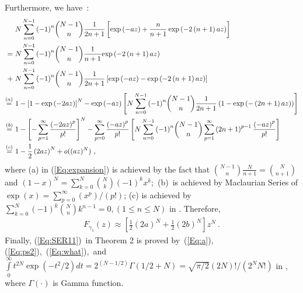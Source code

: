 \documentclass[onecolumn,letterpaper,11pt,draftclsnofoot]{IEEEtran}
\begin{document}
Furthermore,  we have~:
\begin{align} \label{Eq:expansion}
&N\sum\limits_{n = 0}^{N - 1} {\left( { - 1} \right)^n }
\binom{N-1}{n}\frac{1}{{2n + 1}}\left[ {\exp \left( { - az} \right)
+ \frac{n}{{n + 1}}\exp \left( { - 2\left( {n + 1} \right)az}
\right)} \right]\\\notag =~&N\sum\limits_{n = 0}^{N - 1} {\left( { -
1} \right)^n } \binom{N-1}{n}\frac{1}{{n + 1}} {\exp \left( { -
2\left( {n + 1} \right)az} \right)} \\\notag +~&N\sum\limits_{n =
0}^{N - 1} {\left( { - 1} \right)^n } \binom{N-1}{n}\frac{1}{{2n +
1}} \left[\exp \left( { - az} \right) - \exp \left( { - 2\left( {n +
1} \right)az} \right)\right]
\\\notag
\buildrel \left(a\right) \over=~&1 - \left[ {1 - \exp \left( { -
2az} \right)} \right]^N  - \exp \left( { - az} \right)\left[
{N\sum\limits_{n = 0}^{N - 1} {\left( { - 1} \right)^n }
\binom{N-1}{n}\frac{1}{{2n + 1}}\left( {1 - \exp \left( { - \left(
{2n + 1} \right)az} \right)} \right)} \right]
\\\notag
\buildrel \left(b\right) \over =~&1 - \left[ { - \sum\limits_{p =
1}^\infty  {\frac{{\left( { - 2az} \right)^p }}{{p!}}} } \right]^N -
\sum\limits_{p = 0}^\infty  {\frac{{\left( { - az} \right)^p
}}{{p!}}} \left[N\sum\limits_{n = 0}^{N - 1} {\left( { - 1}
\right)^n } \binom{N-1}{n}\sum\limits_{p = 1}^\infty  {\left(2n +
1\right)^{p - 1} \frac{{\left( { - az} \right)^p }}{{p!}}}\right]
\\\notag
\buildrel \left(c\right) \over = ~&1 - \frac{1}{2}\left(2az\right)^N
+ o((az)^N )~,
\end{align}
where (a) in (\ref{Eq:expansion}) is achieved by the fact that
$\binom{N-1}{n}\frac{N}{n+1}=\binom{N}{n+1}$ and $\left( {1 - x}
\right)^N = \sum\nolimits_{k = 0}^N {\binom{N}{k}} \left( { - 1}
\right)^k x^k$;~(b)~is achieved by Maclaurian Series of $ \exp
\left( x \right) = \sum\nolimits_{p = 0}^\infty
\left(x^p\right)/\left(p!\right) $; (c) is achieved by
$\sum\nolimits_{k = 0}^N {\left( { - 1} \right)^k \binom{N}{n}k^{n -
1} }  = 0, \left( {1 \le n \le N} \right)$ in
\cite[(0.154.3)]{Gradshteyn94}. Therefore,\begin{align} F_{\gamma
_1} \left(z\right) \approx [\frac{1}{2}\left(2a\right)^N  +
\frac{1}{2}\left(2b\right)^N ]z^N~.\label{Eq:what}
\end{align}
Finally, (\ref{Eq:SER11})~in Theorem 2 is proved by~(\ref{Eq:a}),~
(\ref{Eq:ps2}),~(\ref{Eq:what}),~and $\int\limits_0^\infty {t^{2N} }
\exp \left( -{t^2}/{2}\right)dt={2^{\left(N-{1}/{2}\right)}}\Gamma
\left({1}/{2} + N\right)= \sqrt {{\pi}/{2}}
{{\left(2N\right)!}}/{{\left(2^N N!\right)}} $ in
\cite[(3.326.2)]{Gradshteyn94}, where $\Gamma\left(\cdot\right)$ is
Gamma function\cite{Abramowitz}.
\end{document}
